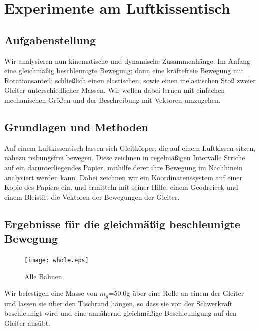 \documentclass{article}
\begin{document}
\section{Experimente am Luftkissentisch}

\subsection{Aufgabenstellung}
Wir analysieren nun kinematische und dynamische Zusammenhänge. 
Im Anfang eine gleichmäßig beschleunigte Bewegung; dann eine kräftefreie Bewegung mit Rotationsanteil; schließlich einen elastischen, sowie einen inelastischen Stoß zweier Gleiter unterschiedlicher Massen. Wir wollen dabei lernen mit einfachen mechanischen Größen und der Beschreibung mit Vektoren umzugehen. 

\subsection{Grundlagen und Methoden}

Auf einem Luftkissentisch lassen sich Gleitkörper, die auf einem Luftkissen sitzen, nahezu reibungsfrei bewegen. Diese zeichnen in regelmäßigen Intervalle Striche auf ein darunterliegendes Papier, mithilfe derer ihre Bewegung im Nachhinein analysiert werden kann. Dabei zeichnen wir ein Koordinatenssystem auf einer Kopie des Papiers ein, und ermitteln mit seiner Hilfe, einem Geodreieck und einem Bleistift die Vektoren der Bewegungen der Gleiter.



\subsection{Ergebnisse für die gleichmäßig beschleunigte Bewegung}
\begin{figure}[H]
\caption{Alle Bahnen}
\begin{center}
\texttt{[image: whole.eps]}
\end{center}
\end{figure}

 Wir befestigen eine Masse von $m_g$=50.0g über eine Rolle an einem der Gleiter und lassen sie über den Tischrand hängen, so dass sie von der Schwerkraft beschleunigt wird und eine annähernd gleichmäßige Beschleunigung auf den Gleiter ausübt.
\end{document}
